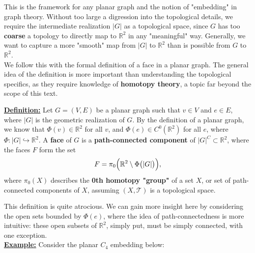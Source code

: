 \documentclass{article}
\begin{document}
\noindent This is the framework for any planar graph and the notion of "embedding" in graph theory\cite{Diestel2005}. Without too large a digression into the topological details, we require the intermediate realization $|G|$ as a topological space, since $G$ has too \textbf{coarse} a topology to directly map to $\mathbb{R}^{2}$ in any "meaningful" way. Generally, we want to capture a more "smooth" map from $|G|$ to $\mathbb{R}^{2}$ than is possible from $G$ to $\mathbb{R}^{2}$.\\

\noindent We follow this with the formal definition of a face in a planar graph. The general idea of the definition is more important than understanding the topological specifics, as they require knowledge of \textbf{homotopy theory}, a topic far beyond the scope of this text.

\pagebreak

\begin{graybox}
\noindent\underline{\textbf{Definition:}} Let $G = (V,E)$ be a planar graph such that $v\in V$ and $e\in E$, where $|G|$ is the geometric realization of $G$. By the definition of a planar graph, we know that $\Phi(v)\in\mathbb{R}^{2}$ for all $v$, and $\Phi(e) \in C^{0}(\mathbb{R}^{2})$ for all $e$, where $\Phi:|G| \hookrightarrow \mathbb{R}^{2}$. A \textbf{face} of $G$ is a \textbf{path-connected component} of $|G|^{C} \subset \mathbb{R}^{2}$, where the faces $F$ form the set
\[F = \pi_{0}\Bigl(\mathbb{R}^{2}\setminus \Phi\bigl(|G|\bigr)\Bigr),\]
where $\pi_{0}(X)$ describes the \textbf{0th homotopy "group"}\footnotemark{} of a set $X$, or set of path-connected components of $X$, assuming $(X, \mathcal{T})$ is a topological space.
\end{graybox}



\noindent This definition is quite atrocious. We can gain more insight here by considering the open sets bounded by $\Phi(e)$, where the idea of path-connectedness is more intuitive: these open subsets of $\mathbb{R}^{2}$, simply put, must be simply connected, with one exception.\\

\noindent\underline{\textbf{Example:}} Consider the planar $C_{4}$ embedding below:\\
\end{document}
